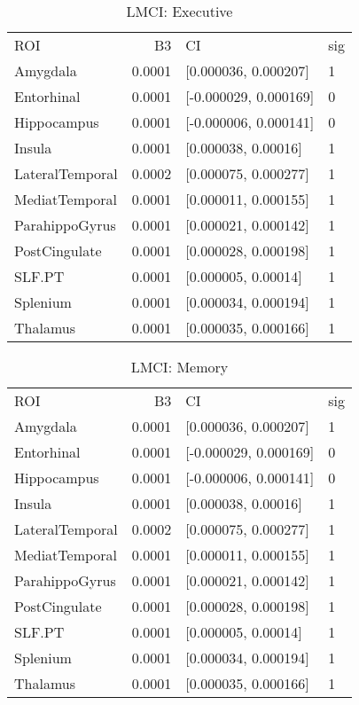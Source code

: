 \documentclass{article}
\begin{document}
\begin{table}[H]
\centering
\caption{LMCI: Executive} 
\begin{tabular}{lrll}
  \toprule
ROI & B3 & CI & sig \\ 
  \rowcolor{orange!30} \midrule
Amygdala & 0.0001 & [0.000036, 0.000207] & 1 \\ 
  Entorhinal & 0.0001 & [-0.000029, 0.000169] & 0 \\ 
  Hippocampus & 0.0001 & [-0.000006, 0.000141] & 0 \\ 
   \rowcolor{orange!30}Insula & 0.0001 & [0.000038, 0.00016] & 1 \\ 
   \rowcolor{orange!30}LateralTemporal & 0.0002 & [0.000075, 0.000277] & 1 \\ 
   \rowcolor{orange!30}MediatTemporal & 0.0001 & [0.000011, 0.000155] & 1 \\ 
   \rowcolor{orange!30}ParahippoGyrus & 0.0001 & [0.000021, 0.000142] & 1 \\ 
   \rowcolor{orange!30}PostCingulate & 0.0001 & [0.000028, 0.000198] & 1 \\ 
   \rowcolor{orange!30}SLF.PT & 0.0001 & [0.000005, 0.00014] & 1 \\ 
   \rowcolor{orange!30}Splenium & 0.0001 & [0.000034, 0.000194] & 1 \\ 
   \rowcolor{orange!30}Thalamus & 0.0001 & [0.000035, 0.000166] & 1 \\ 
   \bottomrule
\end{tabular}
\end{table}%
\begin{table}[H]
\centering
\caption{LMCI: Memory} 
\begin{tabular}{lrll}
  \toprule
ROI & B3 & CI & sig \\ 
  \rowcolor{orange!30} \midrule
Amygdala & 0.0001 & [0.000036, 0.000207] & 1 \\ 
  Entorhinal & 0.0001 & [-0.000029, 0.000169] & 0 \\ 
  Hippocampus & 0.0001 & [-0.000006, 0.000141] & 0 \\ 
   \rowcolor{orange!30}Insula & 0.0001 & [0.000038, 0.00016] & 1 \\ 
   \rowcolor{orange!30}LateralTemporal & 0.0002 & [0.000075, 0.000277] & 1 \\ 
   \rowcolor{orange!30}MediatTemporal & 0.0001 & [0.000011, 0.000155] & 1 \\ 
   \rowcolor{orange!30}ParahippoGyrus & 0.0001 & [0.000021, 0.000142] & 1 \\ 
   \rowcolor{orange!30}PostCingulate & 0.0001 & [0.000028, 0.000198] & 1 \\ 
   \rowcolor{orange!30}SLF.PT & 0.0001 & [0.000005, 0.00014] & 1 \\ 
   \rowcolor{orange!30}Splenium & 0.0001 & [0.000034, 0.000194] & 1 \\ 
   \rowcolor{orange!30}Thalamus & 0.0001 & [0.000035, 0.000166] & 1 \\ 
   \bottomrule
\end{tabular}
\end{table}
\end{document}
